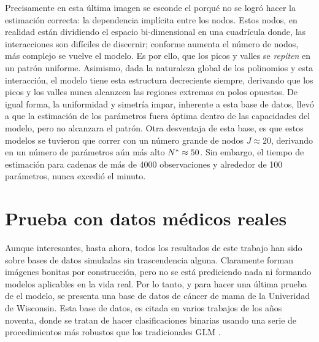 \documentclass[../Main/Main.tex]{subfiles}
\begin{document}
Precisamente en esta última imagen se esconde el porqué no se logró hacer la estimación correcta: la dependencia implícita entre los nodos. Estos nodos, en realidad están dividiendo el espacio bi-dimensional en una cuadrícula donde,  las interacciones son difíciles de discernir; conforme aumenta el número de nodos, más complejo se vuelve el modelo. Es por ello, que los picos y valles se \textit{repiten} en un patrón uniforme. Asimismo, dada la naturaleza global de los polinomios y esta interacción, el modelo tiene esta estructura decreciente siempre, derivando que los picos y los valles nunca alcanzcen las regiones extremas en polos opuestos. De igual forma, la uniformidad y simetría impar, inherente a esta base de datos, llevó a que la estimación de los parámetros fuera óptima dentro de las capacidades del modelo, pero no alcanzara el patrón. Otra desventaja de esta base, es que estos modelos se tuvieron que correr con un número grande de nodos $J \approx 20$, derivando en un número de parámetros aún más alto $N^* \approx 50$. Sin embargo, el tiempo de estimación para cadenas de más de 4000 observaciones y alrededor de 100 parámetros, nunca excedió el minuto. 

\section{Prueba con datos médicos reales}
Aunque interesantes, hasta ahora, todos los resultados de este trabajo han sido sobre bases de datos simuladas sin trascendencia alguna. Claramente forman imágenes bonitas por construcción, pero no se está prediciendo nada ni formando modelos aplicables en la vida real. Por lo tanto, y para hacer una última prueba de el modelo, se presenta una base de datos de cáncer de mama de la Univeridad de Wisconsin. Esta base de datos, es citada en varios trabajos de los años noventa, donde se tratan de hacer clasificaciones binarias usando una serie de procedimientos más robustos que los tradicionales GLM \autocite{mangasarian1990pattern} \autocite{bennett1992robust}.
\end{document}
